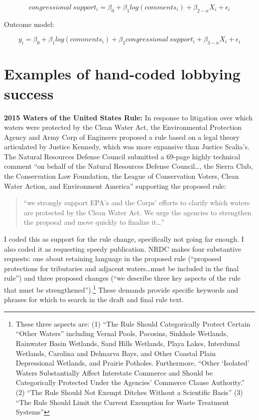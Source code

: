\documentclass[
]{book}
\begin{document}
\[
congressional\ support_i = \beta_0 + \beta_1 log(comments_i) + \beta_{2-n} X_i + \epsilon_i
\]

Outcome model:

\[
y_i = \beta_0 + \beta_1 log(comments_i) + \beta_2 congressional\ support_i + \beta_{3-n} X_i + \epsilon_i
\]

\hypertarget{examples-of-hand-coded-lobbying-success}{%
\section{Examples of hand-coded lobbying success}\label{examples-of-hand-coded-lobbying-success}}

\textbf{2015 Waters of the United States Rule:}
In response to litigation over which waters were protected by the Clean Water Act, the Environmental Protection Agency and Army Corp of Engineers proposed a rule based on a legal theory articulated by Justice Kennedy, which was more expansive than Justice Scalia's.
The Natural Resources Defense Council submitted a 69-page highly technical comment ``on behalf of the Natural Resources Defense Council\ldots, the Sierra Club, the Conservation Law Foundation, the League of Conservation Voters, Clean Water Action, and Environment America'' supporting the proposed rule:

\begin{quote}
``we strongly support EPA's and the Corps' efforts to clarify which waters are protected by the Clean Water Act. We urge the agencies to strengthen the proposal and move quickly to finalize it\ldots{}''
\end{quote}

I coded this as support for the rule change, specifically not going far enough. I also coded it as requesting speedy publication. NRDC makes four substantive requests: one about retaining language in the proposed rule (``proposed protections for tributaries and adjacent waters\ldots must be included in the final rule'') and three proposed changes (``we describe three key aspects of the rule that must be strengthened'').\footnote{These three aspects are: (1) ``The Rule Should Categorically Protect Certain ``Other Waters'' including Vernal Pools, Pocosins, Sinkhole Wetlands, Rainwater Basin Wetlands, Sand Hills Wetlands, Playa Lakes, Interdunal Wetlands, Carolina and Delmarva Bays, and Other Coastal Plain Depressional Wetlands, and Prairie Potholes. Furthermore, ``Other `Isolated' Waters Substantially Affect Interstate Commerce and Should be Categorically Protected Under the Agencies' Commerce Clause Authority.'' (2) ``The Rule Should Not Exempt Ditches Without a Scientific Basis'' (3) ``The Rule Should Limit the Current Exemption for Waste Treatment Systems''} These demands provide specific keywords and phrases for which to search in the draft and final rule text.
\end{document}
